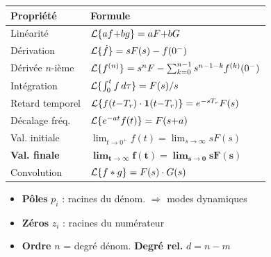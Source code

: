 \begin{tcolorbox}[colback=ch2orange!5,colframe=ch2orange!80!black,title={Propri\'et\'es de la transform\'ee}]
\begin{center}
\renewcommand{\arraystretch}{1.05}
\scriptsize
\begin{tabular}{@{}ll@{}}
\toprule
Propri\'et\'e & Formule \\
\midrule
Lin\'earit\'e & $\mathcal{L}\{af{+}bg\} = aF{+}bG$ \\
D\'erivation & $\mathcal{L}\{\dot{f}\} = sF(s) - f(0^-)$ \\
D\'eriv\'ee $n$-i\`eme & $\mathcal{L}\{f^{(n)}\} = s^n F - \sum_{k=0}^{n-1} s^{n-1-k} f^{(k)}(0^-)$ \\
Int\'egration & $\mathcal{L}\{\int_0^t f\,d\tau\} = F(s)/s$ \\
Retard temporel & $\mathcal{L}\{f(t{-}T_r)\cdot\mathbf{1}(t{-}T_r)\} = e^{-sT_r}F(s)$ \\
D\'ecalage fr\'eq. & $\mathcal{L}\{e^{-at}f(t)\} = F(s{+}a)$ \\
Val. initiale & $\lim_{t\to 0^+} f(t) = \lim_{s\to\infty} sF(s)$ \\
\textbf{Val. finale} & $\boldsymbol{\lim_{t\to\infty} f(t) = \lim_{s\to 0} sF(s)}$ \\
Convolution & $\mathcal{L}\{f*g\} = F(s)\cdot G(s)$ \\
\bottomrule
\end{tabular}
\end{center}
\end{tcolorbox}

\begin{tcolorbox}[colback=ch2orange!5,colframe=ch2orange!80!black,title={Fonction de transfert}]
\begin{itemize}
  \item \textbf{P\^oles} $p_i$ : racines du d\'enom. $\Rightarrow$ modes dynamiques
  \item \textbf{Z\'eros} $z_i$ : racines du num\'erateur
  \item \textbf{Ordre} $n$ = degr\'e d\'enom. \quad \textbf{Degr\'e rel.} $d = n - m$
\end{itemize}
\end{tcolorbox}

